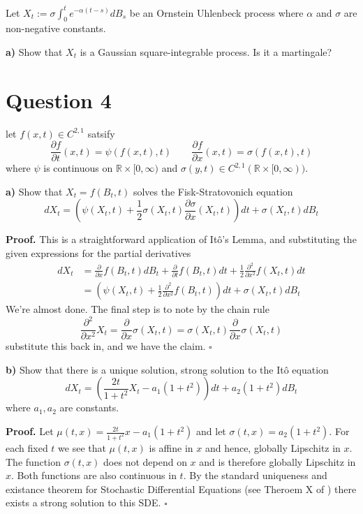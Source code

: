 \documentclass{article}
\begin{document}
\begin{tcolorbox}
[colframe=black,colback=gray!5,boxrule=0.5pt]
 Let $X_t := \sigma\int_0^t e^{-\alpha(t-s)}dB_s$ be an Ornstein Uhlenbeck process where $\alpha$ and $\sigma$ are non-negative constants. 
\end{tcolorbox}
\begin{tcolorbox}
[colframe=black,colback=gray!5,boxrule=0.5pt]
 \textbf{a)} Show that $X_t$ is a Gaussian square-integrable process. Is it a martingale? 
\end{tcolorbox}


\newpage
\section{Question 4}
\begin{tcolorbox}
[colframe=black,colback=gray!5,boxrule=0.5pt]
  let $f(x,t)\in C^{2,1}$ satsify
  $$\frac{\partial f}{\partial t}(x,t) = \psi(f(x,t),t) \quad\quad \frac{\partial f}{\partial x}(x,t) = \sigma(f(x,t),t)$$
  where $\psi$ is continuous on $\mathbb{R}\times[0,\infty)$ and $\sigma(y,t)\in C^{2,1}(\mathbb{R}\times[0,\infty)).$ 
\end{tcolorbox}
\begin{tcolorbox}
[colframe=black,colback=gray!5,boxrule=0.5pt]
 \textbf{a)} Show that $X_t = f(B_t, t)$ solves the Fisk-Stratovonich equation
 $$dX_t = \left(\psi(X_t,t) + \frac{1}{2}\sigma(X_t,t)\frac{\partial \sigma}{\partial x}(X_t,t)\right)dt + \sigma(X_t,t)dB_t$$
\end{tcolorbox}
\textbf{Proof.} This is a straightforward application of Itô's Lemma, and substituting the given expressions for the partial derivatives
\begin{align*}
    dX_t &= \frac{\partial}{\partial x}f(B_t, t)dB_t + \frac{\partial}{\partial t}f(B_t, t)dt + \frac{1}{2}\frac{\partial^2}{\partial x^2}f(X_t, t)dt \\
    &= \left(\psi(X_t,t) + \frac{1}{2}\frac{\partial^2 }{\partial x^2}f(B_t,t)\right)dt + \sigma(X_t,t)dB_t
\end{align*}
We're almost done. The final step is to note by the chain rule
$$\frac{\partial^2 }{\partial x^2} X_t = \frac{\partial}{\partial x}\sigma(X_t,t) = \sigma(X_t,t)\frac{\partial}{\partial x}\sigma(X_t,t)$$
substitute this back in, and we have the claim. $\square$

\begin{tcolorbox}
[colframe=black,colback=gray!5,boxrule=0.5pt]
 \textbf{b)} Show that there is a unique solution, strong solution to the Itô equation
 $$dX_t = \left(\frac{2t}{1+t^2}X_t - a_1(1+t^2)\right)dt + a_2(1+t^2)dB_t$$
 where $a_1, a_2$ are constants. 
\end{tcolorbox}
\textbf{Proof.} Let $\mu(t,x) = \frac{2t}{1+t^2}x - a_1(1+t^2)$ and let $\sigma(t,x) = a_2(1+t^2)$. For each fixed $t$ we see that $\mu(t,x)$ is affine in $x$ and hence, globally Lipschitz in $x$. The function $\sigma(t,x)$ does not depend on $x$ and is therefore globally Lipschitz in $x$. Both functions are also continuous in $t$. 
By the standard uniqueness and existance theorem for Stochastic Differential Equations (see Theroem X of \cite{Fima}) there exists a strong solution to this SDE. $\square$
\end{document}
